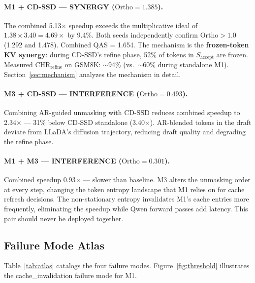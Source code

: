\documentclass{article}
\newcommand{\ortho}{\text{Ortho}}
\newcommand{\chr}{\text{CHR}}
\newcommand{\Saccept}{S_{\text{accept}}}
\begin{document}
\paragraph{M1 + CD-SSD --- SYNERGY ($\ortho = 1.385$).} The combined 5.13$\times$ speedup exceeds
the multiplicative ideal of $1.38 \times 3.40 = 4.69\times$ by 9.4\%. Both seeds independently
confirm $\ortho > 1.0$ (1.292 and 1.478). Combined QAS = 1.654. The mechanism is the
\textbf{frozen-token KV synergy}: during CD-SSD's refine phase, 52\% of tokens in $\Saccept$ are
frozen. Measured $\chr_{\text{refine}}$ on GSM8K: ${\sim}94\%$ (vs.\ ${\sim}60\%$ during standalone
M1). Section~\ref{sec:mechanism} analyzes the mechanism in detail.

\paragraph{M3 + CD-SSD --- INTERFERENCE ($\ortho = 0.493$).} Combining AR-guided unmasking with
CD-SSD reduces combined speedup to 2.34$\times$ --- 31\% below CD-SSD standalone (3.40$\times$).
AR-blended tokens in the draft deviate from LLaDA's diffusion trajectory, reducing draft quality
and degrading the refine phase.

\paragraph{M1 + M3 --- INTERFERENCE ($\ortho = 0.301$).} Combined speedup 0.93$\times$ --- slower
than baseline. M3 alters the unmasking order at every step, changing the token entropy landscape
that M1 relies on for cache refresh decisions. The non-stationary entropy invalidates M1's cache
entries more frequently, eliminating the speedup while Qwen forward passes add latency. This pair
should never be deployed together.

\subsection{Failure Mode Atlas}
\label{sec:atlas}

Table~\ref{tab:atlas} catalogs the four failure modes. Figure~\ref{fig:threshold} illustrates the
cache\_invalidation failure mode for M1.
\end{document}
